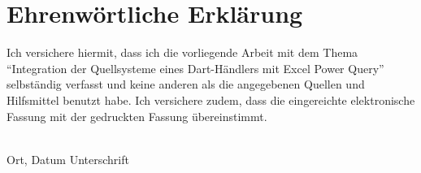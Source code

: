 \documentclass[a4paper,12pt]{article}
\newcommand{\arbeitstitel}{Integration der Quellsysteme eines Dart-Händlers mit Excel Power Query}
\begin{document}
\newpage
\thispagestyle{empty}
\section*{Ehrenwörtliche Erklärung}
Ich versichere hiermit, dass ich die vorliegende Arbeit mit dem Thema \enquote{\arbeitstitel} selbständig verfasst und keine anderen als die angegebenen Quellen und Hilfsmittel benutzt habe. Ich versichere zudem, dass die eingereichte elektronische Fassung mit der gedruckten Fassung übereinstimmt.

\vspace{2cm}
\makebox[0.5\textwidth]{\hrulefill} \hfill \makebox[0.4\textwidth]{\hrulefill} \\
Ort, Datum \hfill Unterschrift
\end{document}
